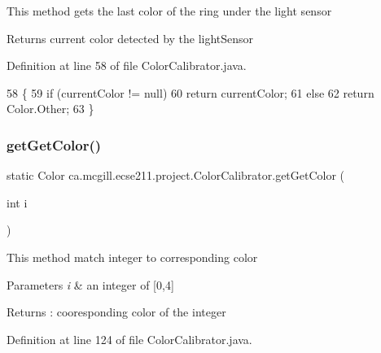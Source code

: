 This method gets the last color of the ring under the light sensor

\begin{DoxyReturn}{Returns}
current color detected by the light\+Sensor 
\end{DoxyReturn}


Definition at line 58 of file Color\+Calibrator.\+java.


\begin{DoxyCode}
58                                  \{
59     \textcolor{keywordflow}{if} (currentColor != null)
60       \textcolor{keywordflow}{return} currentColor;
61     \textcolor{keywordflow}{else}
62       \textcolor{keywordflow}{return} Color.Other;
63   \}
\end{DoxyCode}
\mbox{\label{classca_1_1mcgill_1_1ecse211_1_1project_1_1_color_calibrator_acb1d9cef0739971dbe00cc16712be0fe}} 
\subsubsection{\texorpdfstring{get\+Get\+Color()}{getGetColor()}}
{\footnotesize\ttfamily static Color ca.\+mcgill.\+ecse211.\+project.\+Color\+Calibrator.\+get\+Get\+Color (\begin{DoxyParamCaption}\item[{int}]{i }\end{DoxyParamCaption})\hspace{0.3cm}{\ttfamily [static]}}

This method match integer to corresponding color 
\begin{DoxyParams}{Parameters}
{\em i} & an integer of \mbox{[}0,4\mbox{]} \\
\hline
\end{DoxyParams}
\begin{DoxyReturn}{Returns}
\+: cooresponding color of the integer 
\end{DoxyReturn}


Definition at line 124 of file Color\+Calibrator.\+java.


